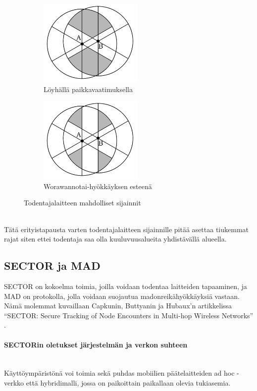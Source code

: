 \documentclass[finnish]{tktltiki2}
\theoremstyle{definition}
\theoremstyle{remark}
\begin{document}
\begin{figure}[!ht]
\begin{subfigure}{.5\textwidth}
  \centering
  \includegraphics[width=5cm]{verifier-loose}
  \caption{Löyhällä paikkavaatimuksella}
  \label{fig:sub1}
\end{subfigure}%
\begin{subfigure}{.5\textwidth}
  \centering
  \includegraphics[width=5cm]{verifier-strict}
  \caption{Worawannotai-hyökkäyksen esteenä}
  \label{fig:sub2}
\end{subfigure}%
\caption{Todentajalaitteen mahdolliset sijainnit}
\label{fig:test}
\end{figure}

\noindent \\
Tätä erityistapausta varten todentajalaitteen sijainnille pitää asettaa tiukemmat rajat siten ettei todentaja saa olla kuuluvuusalueita yhdistävällä alueella.

% 
% 
% 
% 
% 
% 
% 
% 
% 
% 
% 
% 
\subsection{SECTOR ja MAD}
% 
% 
% 
% 
% 
% 
% 
% 
% 
% 
% 
% 
% 
% 
% 
% 

SECTOR on kokoelma toimia, joilla voidaan todentaa laitteiden tapaaminen, ja MAD on protokolla, jolla voidaan suojautua madonreikähyökkäyksiä vastaan. Nämä molemmat kuvaillaan Capkunin, Buttyanin ja Hubaux'n artikkelissa ``SECTOR: Secure Tracking of Node Encounters in Multi-hop Wireless Networks'' \cite{sector}.

\paragraph{SECTORin oletukset järjestelmän ja verkon suhteen}
\noindent \\
Käyttöympäristönä voi toimia sekä puhdas mobiilien päätelaitteiden ad hoc -verkko että hybridimalli, jossa on paikoittain paikallaan olevia tukiasemia. 
\end{document}
